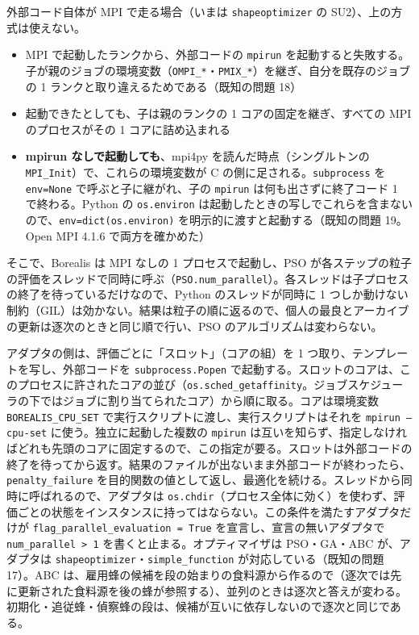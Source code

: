 \documentclass[11pt,a4paper,dvipdfmx]{jsarticle}
\begin{document}
外部コード自体が MPI で走る場合（いまは \texttt{shapeoptimizer} の SU2）、上の方式は使えない。

\begin{itemize}
\item MPI で起動したランクから、外部コードの \texttt{mpirun} を起動すると失敗する。子が親のジョブの環境変数（\texttt{OMPI\_*}・\texttt{PMIX\_*}）を継ぎ、自分を既存のジョブの 1 ランクと取り違えるためである（既知の問題 18）
\item 起動できたとしても、子は親のランクの 1 コアの固定を継ぎ、すべての MPI のプロセスがその 1 コアに詰め込まれる
\item \textbf{mpirun なしで起動しても}、mpi4py を読んだ時点（シングルトンの \texttt{MPI\_Init}）で、これらの環境変数が C の側に足される。\texttt{subprocess} を \texttt{env=None} で呼ぶと子に継がれ、子の \texttt{mpirun} は何も出さずに終了コード 1 で終わる。Python の \texttt{os.environ} は起動したときの写しでこれらを含まないので、\texttt{env=dict(os.environ)} を明示的に渡すと起動する（既知の問題 19。Open MPI 4.1.6 で両方を確かめた）
\end{itemize}

そこで、Borealis は MPI なしの 1 プロセスで起動し、PSO が各ステップの粒子の評価をスレッドで同時に呼ぶ（\texttt{PSO.num\_parallel}）。各スレッドは子プロセスの終了を待っているだけなので、Python のスレッドが同時に 1 つしか動けない制約（GIL）は効かない。結果は粒子の順に返るので、個人の最良とアーカイブの更新は逐次のときと同じ順で行い、PSO のアルゴリズムは変わらない。

アダプタの側は、評価ごとに「スロット」（コアの組）を 1 つ取り、テンプレートを写し、外部コードを \texttt{subprocess.Popen} で起動する。スロットのコアは、このプロセスに許されたコアの並び（\texttt{os.sched\_getaffinity}。ジョブスケジューラの下ではジョブに割り当てられたコア）から順に取る。コアは環境変数 \texttt{BOREALIS\_CPU\_SET} で実行スクリプトに渡し、実行スクリプトはそれを \texttt{mpirun --cpu-set} に使う。独立に起動した複数の \texttt{mpirun} は互いを知らず、指定しなければどれも先頭のコアに固定するので、この指定が要る。スロットは外部コードの終了を待ってから返す。結果のファイルが出ないまま外部コードが終わったら、\texttt{penalty\_failure} を目的関数の値として返し、最適化を続ける。スレッドから同時に呼ばれるので、アダプタは \texttt{os.chdir}（プロセス全体に効く）を使わず、評価ごとの状態をインスタンスに持ってはならない。この条件を満たすアダプタだけが \texttt{flag\_parallel\_evaluation = True} を宣言し、宣言の無いアダプタで \texttt{num\_parallel > 1} を書くと止まる。オプティマイザは PSO・GA・ABC が、アダプタは \texttt{shapeoptimizer}・\texttt{simple\_function} が対応している（既知の問題 17）。ABC は、雇用蜂の候補を段の始まりの食料源から作るので（逐次では先に更新された食料源を後の蜂が参照する）、並列のときは逐次と答えが変わる。初期化・追従蜂・偵察蜂の段は、候補が互いに依存しないので逐次と同じである。
\end{document}
